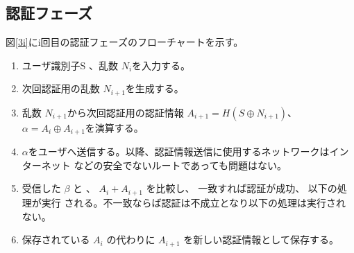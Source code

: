 \documentclass{thesis}
\begin{document}
\subsection{認証フェーズ}
図\ref{3i}にi回目の認証フェーズのフローチャートを示す。

\begin{enumerate}[1.]
				\item ユーザ識別子S 、乱数 $N_{i}$を入力する。
				\item 次回認証用の乱数 $N_{i+1}$を生成する。
				\item 乱数 $N_{i+1}$から次回認証用の認証情報 $A_{i+1} = H(S \oplus N_{i+1} )$、
				$\alpha = A_i \oplus A_{i+1} $を演算する。
				\item $\alpha$をユーザへ送信する。以降、認証情報送信に使用するネットワークはインターネット
				などの安全でないルートであっても問題はない。
				\item 受信した $\beta$  と 、 $A_i + A_{i+1}$ を比較し、 一致すれば認証が成功、 以下の処理が実行
				される。不一致ならば認証は不成立となり以下の処理は実行されない。
				\item 保存されている $A_i$ の代わりに $A_{i+1}$ を新しい認証情報として保存する。
				
\end{enumerate}
\end{document}
